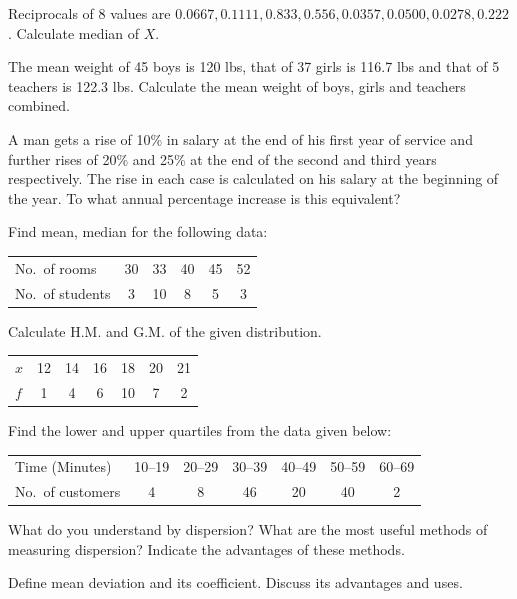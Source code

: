 \documentclass[11pt,a4paper]{article}
\begin{document}
\begin{longlist}
\item Reciprocals of 8 values are $0.0667, 0.1111, 0.833, 0.556, 0.0357, 0.0500, 0.0278, 0.222$. Calculate median of $X$.

\item The mean weight of 45 boys is 120 lbs, that of 37 girls is 116.7 lbs and that of 5 teachers is 122.3 lbs. Calculate the mean weight of boys, girls and teachers combined.

\item A man gets a rise of 10\% in salary at the end of his first year of service and further rises of 20\% and 25\% at the end of the second and third years respectively. The rise in each case is calculated on his salary at the beginning of the year. To what annual percentage increase is this equivalent?

\item Find mean, median for the following data:
\begin{center}
\begin{tabular}{l|ccccc}
No.\ of rooms & 30 & 33 & 40 & 45 & 52 \\
No.\ of students & 3 & 10 & 8 & 5 & 3
\end{tabular}
\end{center}

\item Calculate H.M. and G.M. of the given distribution.
\begin{center}
\begin{tabular}{l|cccccc}
$x$ & 12 & 14 & 16 & 18 & 20 & 21 \\
$f$ & 1 & 4 & 6 & 10 & 7 & 2
\end{tabular}
\end{center}

\item Find the lower and upper quartiles from the data given below:
\begin{center}
\begin{tabular}{l|cccccc}
Time (Minutes) & 10--19 & 20--29 & 30--39 & 40--49 & 50--59 & 60--69 \\
No.\ of customers & 4 & 8 & 46 & 20 & 40 & 2
\end{tabular}
\end{center}

\item What do you understand by dispersion? What are the most useful methods of measuring dispersion? Indicate the advantages of these methods.

\item Define mean deviation and its coefficient. Discuss its advantages and uses.


\end{longlist}
\end{document}
